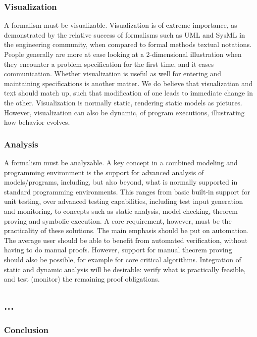 \subsubsection{Visualization}

A formalism must be visualizable.
Visualization is of extreme importance, as demonstrated by the 
relative success of formalisms such as UML and SysML in the 
engineering community, when compared 
to formal methods textual notations. People generally are more at 
ease looking at a 2-dimensional illustration when they encounter a 
problem specification for the first
time, and it eases communication. Whether visualization is useful 
as well for entering
and maintaining specifications is another matter. We do believe 
that visualization and 
text should match up, such that modification of one leads to 
immediate change in the 
other. Visualization is normally static, rendering static models as
pictures. However, visualization can also be dynamic, of program 
executions, illustrating how behavior evolves.

\subsubsection{Analysis}

A formalism must be analyzable.
A key concept in a combined modeling and programming environment is 
the support for advanced analysis of models/programs, including, 
but also beyond, what is normally supported in standard programming 
environments. This ranges from basic built-in support for unit 
testing, over advanced testing capabilities, including test input 
generation and monitoring, to concepts such as static analysis, 
model checking, theorem proving and symbolic execution. A core 
requirement, however, must be the practicality of these solutions. 
The main emphasis should be put on automation. The average user 
should be able to benefit from automated verification, without 
having to do manual proofs. However, support for manual theorem 
proving should also be possible, for example for core critical 
algorithms. Integration of static and dynamic analysis will be 
desirable: verify what is practically feasible, and test (monitor) 
the remaining proof obligations.

\subsection{...}

\subsubsection{Conclusion}

